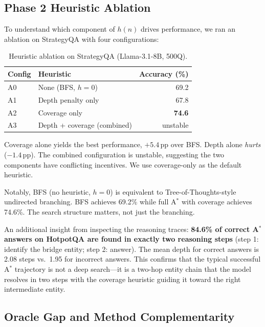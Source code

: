 \documentclass{article}
\newcommand{\astar}{A$^*$\xspace}
\begin{document}
\subsection{Phase 2 Heuristic Ablation}
\label{sec:heuristic_ablation}

To understand which component of $h(n)$ drives performance, we ran an ablation on StrategyQA with four configurations:

\begin{table}[h]
\centering
\caption{Heuristic ablation on StrategyQA (Llama-3.1-8B, 500Q).}
\label{tab:ablation}
\begin{tabular}{llr}
\toprule
Config & Heuristic & Accuracy (\%) \\
\midrule
A0 & None (BFS, $h=0$)         & 69.2 \\
A1 & Depth penalty only        & 67.8 \\
A2 & Coverage only             & \textbf{74.6} \\
A3 & Depth + coverage (combined) & unstable \\
\bottomrule
\end{tabular}
\end{table}

Coverage alone yields the best performance, $+5.4$\,pp over BFS. Depth alone \emph{hurts} ($-1.4$\,pp). The combined configuration is unstable, suggesting the two components have conflicting incentives. We use coverage-only as the default heuristic.

Notably, BFS (no heuristic, $h=0$) is equivalent to Tree-of-Thoughts-style undirected branching. BFS achieves 69.2\% while full \astar with coverage achieves 74.6\%. The search structure matters, not just the branching.

An additional insight from inspecting the reasoning traces: \textbf{84.6\% of correct \astar answers on HotpotQA are found in exactly two reasoning steps} (step 1: identify the bridge entity; step 2: answer). The mean depth for correct answers is 2.08 steps vs.\ 1.95 for incorrect answers. This confirms that the typical successful \astar trajectory is not a deep search---it is a two-hop entity chain that the model resolves in two steps with the coverage heuristic guiding it toward the right intermediate entity.

\subsection{Oracle Gap and Method Complementarity}
\label{sec:oracle}
\end{document}
